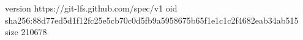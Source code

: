 version https://git-lfs.github.com/spec/v1
oid sha256:88d77ed5d1f12fc25e5cb70c0d5fb9a5958675b65f1e1c1c2f4682eab34ab515
size 210678
